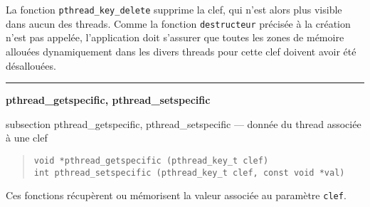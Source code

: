 \documentclass [twoside] {report}
\newcommand {\primitive} [1]
    {
	{\large \bf #1}
	\addcontentsline {toc} {subsection} {#1}
    }
\newcommand {\separation}
    {
	\vspace {7mm}
	\nopagebreak
	\hrule
    }
\begin{document}
La fonction \verb|pthread_key_delete| supprime la clef, qui n'est
alors plus visible dans aucun des threads. Comme la fonction \texttt
{destructeur} précisée à la création n'est pas appelée, l'application
doit s'assurer que toutes les zones de mémoire allouées dynamiquement
dans les divers threads pour cette clef doivent avoir été désallouées.


\separation
\primitive {pthread\_getspecific, pthread\_setspecific} --- donnée du thread associée à une clef

\begin {quote}
\begin {verbatim}
void *pthread_getspecific (pthread_key_t clef)
int pthread_setspecific (pthread_key_t clef, const void *val)
\end{verbatim}
\end {quote}

Ces fonctions récupèrent ou mémorisent la valeur associée au
paramètre \texttt {clef}.



% 
% 



\cleardoublepage

\printindex
\end{document}
